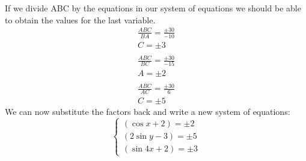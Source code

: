 \documentclass[a4paper,12pt]{article}
\begin{document}
If we divide ABC by the equations in our system of equations we should be able to obtain the values for the last variable.
\begin{equation}
    \begin{split}
        \frac{ABC}{BA}=\frac{\pm 30}{-10} \\
        C = \pm 3 \\ \\
        \frac{ABC}{BC}=\frac{\pm 30}{-15} \\
        A = \pm 2 \\ \\ 
        \frac{ABC}{AC}=\frac{\pm 30}{6} \\
        C = \pm 5
    \end{split}
\end{equation}
We can now substitute the factors back and write a new system of equations: \newline
$$
\begin{cases}
    (\cos x+2) = \pm 2 \\
    (2\sin y-3) = \pm 5 \\
    (\sin 4x+2) = \pm 3 
\end{cases}
$$
\end{document}
